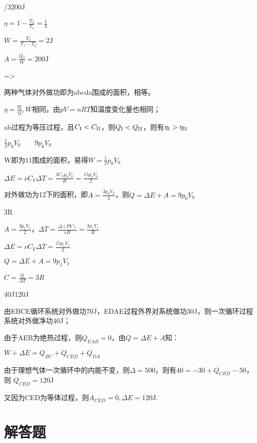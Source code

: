 /3\qquad200J

\solve
$\eta =1-\frac{T_2}{T_1}=\frac{1}{3}$

$W=\frac{T_2}{T_1-T_2}=2\mathrm{J}$

$A=\frac{Q_2}{W}=200\mathrm{J}$

\exercise =\qquad >

\solve 两种气体对外做功即为abcda围成的面积，相等。

$\eta=\frac{W}{Q},W$相同，由$pV=nRT$知温度变化量也相同；

ab过程为等压过程，且$C_{\text{\RNum{1}}}<C_\text{\RNum{2}}$，则$Q_{\text{\RNum{1}}}<Q_{\text{\RNum{2}}}$，则有$\eta_{\text{\RNum{1}}}>\eta_{\text{\RNum{2}}}$

\exercise $\frac{1}{2}p_0V_0\qquad 9p_0V_0$

\solve W即为1\to1围成的面积，易得$W=\frac{1}{2}p_0V_0$

$\Delta E=\nu C_V\Delta T=\frac{3C_Vp_0V_0}{R}=\frac{15p_0V_0}{2}$

对外做功为1\to2下的面积，即$A=\frac{3p_0V_0}{2}$，则$Q=\Delta E+A=9p_0V_0$

\exercise 3R

\solve
$A=\frac{3p_1V_1}{2}$，$\Delta T=\frac{\Delta(PV)}{\nu R}=\frac{3p_1V_1}{R}$

$\Delta E=\nu C_V\Delta T=\frac{15p_1V_1}{2}$

$Q=\Delta E+A=9p_1V_1$

\therefore$C=\frac{Q}{\Delta T}=3R$

\exercise 40J\qquad 120J

\solve 由EBCE循环系统对外做功70J，EDAE过程外界对系统做功30J，则一次循环过程系统对外做净功40J；

由于AEB为绝热过程，则$Q_{EAB}=0$，由$Q=\Delta E+A$知：

$W+\Delta E=Q_{BC}+Q_{CED}+Q_{DA}$

由于理想气体一次循环中的内能不变，则$\Delta=500$，则有$40=-30+Q_{CED}-50$，则
$Q_{CED}=120\mathrm{J}$

又因为CED为等体过程，则$A_{CED}=0,\Delta E=120\mathrm{J}$.

\section{解答题}

\exercise

